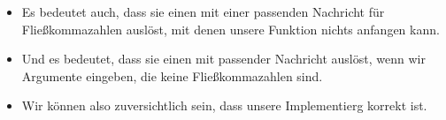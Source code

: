 \documentclass[aspectratio=169,mathserif,notheorems]{beamer}%
\begin{document}
\begin{frame}[t]
{{\begin{itemize}
%
\item<28-> Es bedeutet auch, dass sie einen  mit einer passenden Nachricht für Fließkommazahlen auslöst, mit denen unsere Funktion nichts anfangen kann.%
%
\item<29-> Und es bedeutet, dass sie einen  mit passender Nachricht auslöst, wenn wir Argumente eingeben, die keine Fließkommazahlen sind.%
%
\item<30-> Wir können also zuversichtlich sein, dass unsere Implementierg korrekt ist.%
%
\end{itemize}%
}}%
%
%
%
%
%
%
\end{frame}%
%
%
\end{document}
